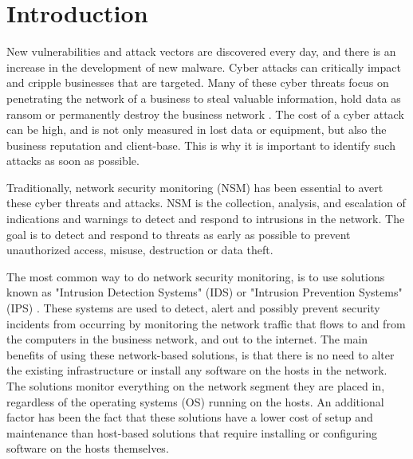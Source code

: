 \chapter{Introduction}
\label{chap:introduction}

\iffalse
Scrutiny of the introduction - http://sepwww.stanford.edu/sep/prof/Intro.html
\fi

New vulnerabilities and attack vectors are discovered every day, and there is an increase in the development of new malware\cite{av_test_security_report_1819}. Cyber attacks can critically impact and cripple businesses that are targeted. Many of these cyber threats focus on penetrating the network of a business to steal valuable information, hold data as ransom or permanently destroy the business network \cite{m-trends_2020}. The cost of a cyber attack can be high, and is not only measured in lost data or equipment, but also the business reputation and client-base. This is why it is important to identify such attacks as soon as possible.

Traditionally, network security monitoring (NSM) has been essential to avert these cyber threats and attacks. 
NSM is the collection, analysis, and escalation of indications and warnings to detect and respond to intrusions in the network. The goal is to detect and respond to threats as early as possible to prevent unauthorized access, misuse, destruction or data theft.

The most common way to do network security monitoring, is to use solutions known as "Intrusion Detection Systems" (IDS) or "Intrusion Prevention Systems" (IPS) \cite{liu_2019}. These systems are used to detect, alert and possibly prevent security incidents from occurring by monitoring the network traffic that flows to and from the computers in the business network, and out to the internet. The main benefits of using these network-based solutions, is that there is no need to alter the existing infrastructure or install any software on the hosts in the network. The solutions monitor everything on the network segment they are placed in, regardless of the operating systems (OS) running on the hosts. An additional factor has been the fact that these solutions have a lower cost of setup and maintenance than host-based solutions that require installing or configuring software on the hosts themselves.

